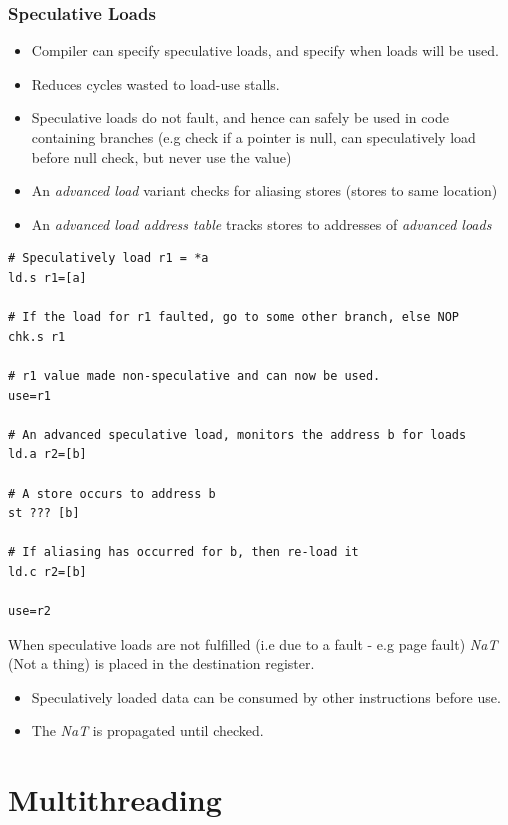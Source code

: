 \subsubsection{Speculative Loads}
\begin{itemize}
    \item Compiler can specify speculative loads, and specify when loads will be used.
    \item Reduces cycles wasted to load-use stalls.
    \item Speculative loads do not fault, and hence can safely be used in code containing branches (e.g check if a pointer is null, can speculatively load before null check, but never use the value)
    \item An \textit{advanced load} variant checks for aliasing stores (stores to same location)
    \item An \textit{advanced load address table} tracks stores to addresses of \textit{advanced loads}
\end{itemize}
\begin{verbatim}
# Speculatively load r1 = *a
ld.s r1=[a]

# If the load for r1 faulted, go to some other branch, else NOP
chk.s r1 

# r1 value made non-speculative and can now be used.
use=r1

# An advanced speculative load, monitors the address b for loads
ld.a r2=[b]

# A store occurs to address b
st ??? [b]

# If aliasing has occurred for b, then re-load it
ld.c r2=[b]

use=r2
\end{verbatim}

When speculative loads are not fulfilled (i.e due to a fault - e.g page fault) \textit{NaT} (Not a thing) is placed in the destination register.
\begin{itemize}
    \item Speculatively loaded data can be consumed by other instructions before use.
    \item The \textit{NaT} is propagated until checked.
\end{itemize}

\unfinished

\section{Multithreading}

